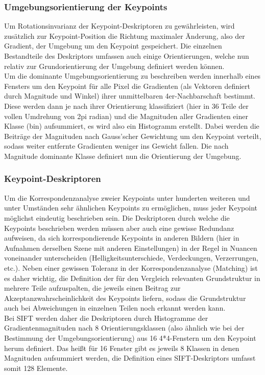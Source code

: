\documentclass[deutsch]{scrartcl}
\begin{document}
\subsubsection{Umgebungsorientierung der Keypoints}
Um Rotationsinvarianz der Keypoint-Deskriptoren zu gewährleisten, wird zusätzlich zur Keypoint-Position die Richtung maximaler Änderung, also der Gradient, der Umgebung um den Keypoint gespeichert. Die einzelnen Bestandteile des Deskriptors umfassen auch einige Orientierungen, welche nun relativ zur Grundorientierung der Umgebung definiert werden können.\\
Um die dominante Umgebungsorientierung zu beschreiben werden innerhalb eines Fensters um den Keypoint für alle Pixel die Gradienten (als Vektoren definiert durch Magnitude und Winkel) ihrer unmittelbaren 4er-Nachbarschaft bestimmt. Diese werden dann je nach ihrer Orientierung  klassifiziert (hier in 36 Teile der vollen Umdrehung von 2pi radian) und die Magnituden aller Gradienten einer Klasse (bin) aufsummiert, es wird also ein Histogramm erstellt. Dabei werden die Beiträge der Magnituden nach Gauss'scher Gewichtung um den Keypoint verteilt, sodass weiter entfernte Gradienten weniger ins Gewicht fallen. Die nach Magnitude dominante Klasse definiert nun die Orientierung der Umgebung.\cite{lowe04}

\subsubsection{Keypoint-Deskriptoren}
Um die Korrespondenzanalyse zweier Keypoints unter hunderten weiteren und unter Umständen sehr ähnlichen Keypoints zu ermöglichen, muss jeder Keypoint möglichst eindeutig beschrieben sein. Die Deskriptoren durch welche die Keypoints beschrieben werden müssen aber auch eine gewisse Redundanz aufweisen, da sich korrespondierende Keypoints in anderen Bildern (hier in Aufnahmen derselben Szene mit anderen Einstellungen) in der Regel in Nuancen voneinander unterscheiden (Helligkeitsunterschiede, Verdeckungen, Verzerrungen, etc.). Neben einer gewissen Toleranz in der Korrespondenzanalyse (Matching) ist es daher wichtig, die Definition der für den Vergleich relevanten Grundstruktur in mehrere Teile aufzuspalten, die jeweils einen Beitrag zur Akzeptanzwahrscheinlichkeit des Keypoints liefern, sodass die Grundstruktur auch bei Abweichungen in einzelnen Teilen noch erkannt werden kann.\\
Bei SIFT werden daher die Deskriptoren durch Histogramme der Gradientenmagnituden nach 8 Orientierungsklassen (also ähnlich wie bei der Bestimmung der Umgebungsorientierung) aus 16 4*4-Fenstern um den Keypoint herum definiert. Das heißt für 16 Fenster gibt es jeweils 8 Klassen in denen Magnituden aufsummiert werden, die Definition eines SIFT-Deskriptors umfasst somit 128 Elemente.\cite{lowe04}
\end{document}
